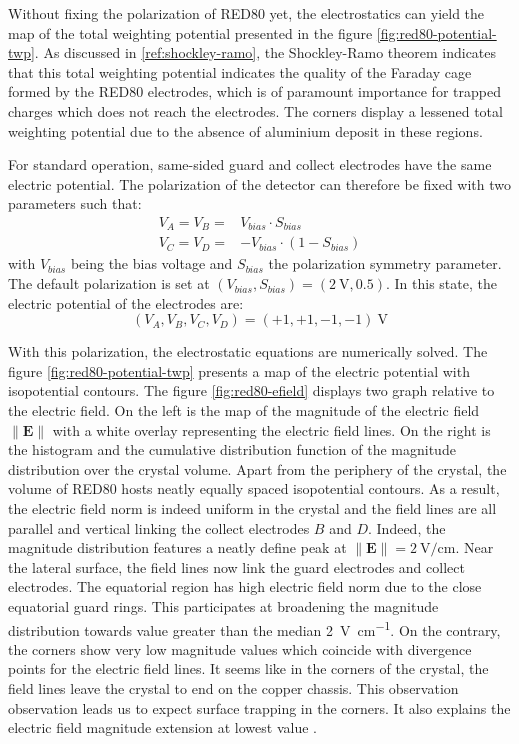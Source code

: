 Without fixing the polarization of RED80 yet, the electrostatics can yield the map of the total weighting potential presented in the figure \ref{fig:red80-potential-twp}.  As discussed in \ref{ref:shockley-ramo}, the Shockley-Ramo theorem indicates that this total weighting potential indicates the quality of the Faraday cage formed by the RED80 electrodes, which is of paramount importance for trapped charges which does not reach the electrodes.
The corners display a lessened total weighting potential due to the absence of aluminium deposit in these regions.

For standard operation, same-sided guard and collect electrodes have the same electric potential. The polarization of the detector can therefore be fixed with two parameters such that:
\begin{align}
V_A = V_B = & V_{bias} \cdot S_{bias} \\
V_C = V_D = & - V_{bias} \cdot \left( 1 - S_{bias} \right)
\end{align}
with $V_{bias}$ being the bias voltage and $S_{bias}$ the polarization symmetry parameter.
The default polarization is set at $\left( V_{bias}, S_{bias} \right) = (\SI{2}{\volt}, 0.5)$. In this state, the electric potential of the electrodes are:
\begin{equation}
(V_A, V_B, V_C, V_D) = (+1, +1, -1, -1)\ \si{\volt}
\end{equation}

With this polarization, the electrostatic equations are numerically solved. The figure \ref{fig:red80-potential-twp} presents a map of the electric potential with isopotential contours. The  figure \ref{fig:red80-efield} displays two graph relative to the electric field. On the left is the map of the magnitude of the electric field $\| \bm{E} \|$ with a white overlay representing the electric field lines. On the right is the histogram and the cumulative distribution function of the magnitude distribution over the crystal volume.
Apart from the periphery of the crystal, the volume of RED80 hosts neatly equally spaced isopotential contours. As a result, the electric field norm is indeed uniform in the crystal and the field lines are all parallel and vertical linking the collect electrodes $B$ and $D$. Indeed, the magnitude distribution features a neatly define peak at $\| \bm{E} \| = \SI{2}{\volt\per\centi\meter}$.
Near the lateral surface, the field lines now link the guard electrodes and collect electrodes. The equatorial region has high electric field norm due to the close equatorial guard rings. This participates at broadening the magnitude distribution towards value greater than the median \SI{2}{\volt\per\centi\meter}.
On the contrary, the corners show very low magnitude values which coincide with divergence points for the electric field lines. It seems like in the corners of the crystal, the field lines leave the crystal to end on the copper chassis. This observation observation leads us to expect surface trapping in the corners. It also explains the electric field magnitude extension at lowest value .

